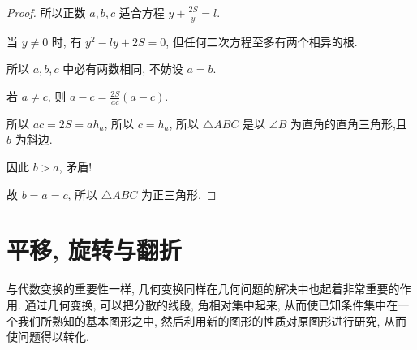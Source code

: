 \documentclass{March}
\begin{document}
\begin{proof}
	所以正数 $a ,  b ,  c$ 适合方程 $y+\frac{2 S}{y}=l$.

	当 $y \neq 0$ 时, 有 $y^2-l y+2 S=0$, 但任何二次方程至多有两个相异的根.

	所以 $a ,  b ,  c$ 中必有两数相同, 不妨设 $a=b$.

	若 $a \neq c$, 则 $a-c=\frac{2 S}{a c}(a-c)$.

	所以 $a c=2 S=a h_a$, 所以 $c=h_a$, 所以 $\triangle A B C$ 是以 $\angle B$ 为直角的直角三角形,且 $b$ 为斜边.

	因此 $b>a$, 矛盾!

	故 $b=a=c$, 所以 $\triangle A B C$ 为正三角形.
\end{proof}

\newpage
\section{平移, 旋转与翻折}
与代数变换的重要性一样, 几何变换同样在几何问题的解决中也起着非常重要的作用. 通过几何变换, 可以把分散的线段, 角相对集中起来, 从而使已知条件集中在一个我们所熟知的基本图形之中, 然后利用新的图形的性质对原图形进行研究, 从而使问题得以转化.
\end{document}
